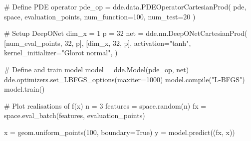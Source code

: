 \documentclass[
  spanish,
  us-letterpaper,
]{scrreprt}
\newenvironment{Shaded}{\begin{snugshade}}{\end{snugshade}}
\newcommand{\BuiltInTok}[1]{\textcolor[rgb]{0.00,0.23,0.31}{#1}}
\newcommand{\CommentTok}[1]{\textcolor[rgb]{0.37,0.37,0.37}{#1}}
\newcommand{\DecValTok}[1]{\textcolor[rgb]{0.68,0.00,0.00}{#1}}
\newcommand{\NormalTok}[1]{\textcolor[rgb]{0.00,0.23,0.31}{#1}}
\newcommand{\OperatorTok}[1]{\textcolor[rgb]{0.37,0.37,0.37}{#1}}
\newcommand{\StringTok}[1]{\textcolor[rgb]{0.13,0.47,0.30}{#1}}
\newcommand{\VariableTok}[1]{\textcolor[rgb]{0.07,0.07,0.07}{#1}}
\theoremstyle{definition}
\theoremstyle{plain}
\theoremstyle{remark}
\begin{document}
\begin{Shaded}
\begin{Highlighting}[]
\CommentTok{\# Define PDE operator}
\NormalTok{pde\_op }\OperatorTok{=}\NormalTok{ dde.data.PDEOperatorCartesianProd(}
\NormalTok{    pde,}
\NormalTok{    space,}
\NormalTok{    evaluation\_points,}
\NormalTok{    num\_function}\OperatorTok{=}\DecValTok{100}\NormalTok{,}
\NormalTok{    num\_test}\OperatorTok{=}\DecValTok{20}
\NormalTok{)}

\CommentTok{\# Setup DeepONet}
\NormalTok{dim\_x }\OperatorTok{=} \DecValTok{1}
\NormalTok{p }\OperatorTok{=} \DecValTok{32}
\NormalTok{net }\OperatorTok{=}\NormalTok{ dde.nn.DeepONetCartesianProd(}
\NormalTok{    [num\_eval\_points, }\DecValTok{32}\NormalTok{, p],}
\NormalTok{    [dim\_x, }\DecValTok{32}\NormalTok{, p],}
\NormalTok{    activation}\OperatorTok{=}\StringTok{"tanh"}\NormalTok{,}
\NormalTok{    kernel\_initializer}\OperatorTok{=}\StringTok{"Glorot normal"}\NormalTok{,}
\NormalTok{)}

\CommentTok{\# Define and train model}
\NormalTok{model }\OperatorTok{=}\NormalTok{ dde.Model(pde\_op, net)}
\NormalTok{dde.optimizers.set\_LBFGS\_options(maxiter}\OperatorTok{=}\DecValTok{1000}\NormalTok{)}
\NormalTok{model.}\BuiltInTok{compile}\NormalTok{(}\StringTok{"L{-}BFGS"}\NormalTok{)}
\NormalTok{model.train()}

\CommentTok{\# Plot realisations of f(x)}
\NormalTok{n }\OperatorTok{=} \DecValTok{3}
\NormalTok{features }\OperatorTok{=}\NormalTok{ space.random(n)}
\NormalTok{fx }\OperatorTok{=}\NormalTok{ space.eval\_batch(features, evaluation\_points)}

\NormalTok{x }\OperatorTok{=}\NormalTok{ geom.uniform\_points(}\DecValTok{100}\NormalTok{, boundary}\OperatorTok{=}\VariableTok{True}\NormalTok{)}
\NormalTok{y }\OperatorTok{=}\NormalTok{ model.predict((fx, x))}
\end{Highlighting}
\end{Shaded}
\end{document}
